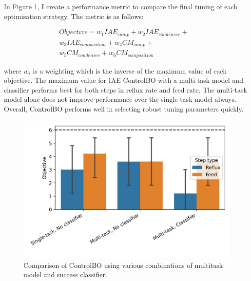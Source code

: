 In Figure \ref{fig:comparison_controlbo}, I create a performance metric to compare the final tuning of each optimisation strategy. The metric is as follows:  

\begin{equation}
\begin{split}
    Objective = w_1 IAE_{sump} + w_2 IAE_{condenser} +  & \\ w_3 IAE_{composition} +  w_4 CM_{sump} + & \\  w_5 CM_{condenser} + w_6 CM_{composition}
\end{split}
\end{equation}

where $w_i$ is a weighting which is the inverse of the maximum value of each objective. The maximum value for IAE ControlBO with a multi-task model and classifier performs best for both steps in reflux rate and feed rate. The multi-task model alone does not improve performance over the single-task model always. Overall, ControlBO performs well in selecting robust tuning parameters quickly.

\begin{figure}
    \centering
    \includegraphics[width=\textwidth]{gfx/Chapter06/comparison.png}
    \caption{Comparison of ControlBO using various combinations of multitask model and success classifier.}
    \label{fig:comparison_controlbo}
\end{figure}



